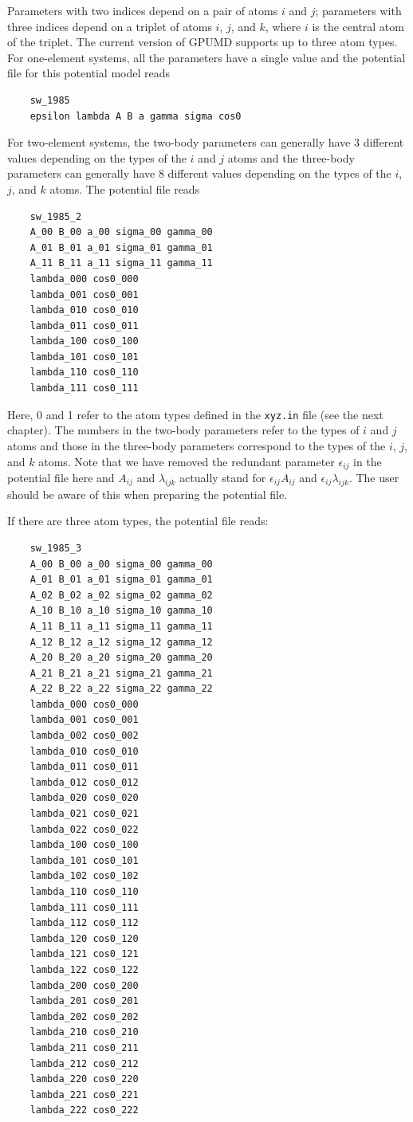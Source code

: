 \documentclass[12pt,a4paper]{report}
\begin{document}
Parameters with two indices depend on a pair of atoms $i$ and $j$; parameters with three indices depend on a triplet of atoms $i$, $j$, and $k$, where $i$ is the central atom of the triplet. The current version of GPUMD supports up to three atom types. For one-element systems, all the parameters have a single value and the potential file for this potential model reads
\begin{verbatim}
    sw_1985
    epsilon lambda A B a gamma sigma cos0
\end{verbatim}
For two-element systems, the two-body parameters can generally have 3 different values depending on the types of the $i$ and $j$ atoms and the three-body parameters can generally have 8 different values depending on the types of the $i$, $j$, and $k$ atoms. The potential file reads
\begin{verbatim}
    sw_1985_2
    A_00 B_00 a_00 sigma_00 gamma_00
    A_01 B_01 a_01 sigma_01 gamma_01
    A_11 B_11 a_11 sigma_11 gamma_11
    lambda_000 cos0_000
    lambda_001 cos0_001
    lambda_010 cos0_010
    lambda_011 cos0_011
    lambda_100 cos0_100
    lambda_101 cos0_101
    lambda_110 cos0_110
    lambda_111 cos0_111
\end{verbatim}
Here, 0 and 1 refer to the atom types defined in the \verb"xyz.in" file (see the next chapter). The numbers in the two-body parameters refer to the types of $i$ and $j$ atoms and those in the three-body parameters correspond to the types of the $i$, $j$, and $k$ atoms. Note that we have removed the redundant parameter $\epsilon_{ij}$ in the potential file here and $A_{ij}$ and $\lambda_{ijk}$ actually stand for $\epsilon_{ij}A_{ij}$ and $\epsilon_{ij}\lambda_{ijk}$. The user should be aware of this when preparing the potential file.

If there are three atom types, the potential file reads:
\begin{verbatim}
    sw_1985_3
    A_00 B_00 a_00 sigma_00 gamma_00
    A_01 B_01 a_01 sigma_01 gamma_01
    A_02 B_02 a_02 sigma_02 gamma_02
    A_10 B_10 a_10 sigma_10 gamma_10
    A_11 B_11 a_11 sigma_11 gamma_11
    A_12 B_12 a_12 sigma_12 gamma_12
    A_20 B_20 a_20 sigma_20 gamma_20
    A_21 B_21 a_21 sigma_21 gamma_21
    A_22 B_22 a_22 sigma_22 gamma_22
    lambda_000 cos0_000
    lambda_001 cos0_001
    lambda_002 cos0_002
    lambda_010 cos0_010
    lambda_011 cos0_011
    lambda_012 cos0_012
    lambda_020 cos0_020
    lambda_021 cos0_021
    lambda_022 cos0_022
    lambda_100 cos0_100
    lambda_101 cos0_101
    lambda_102 cos0_102
    lambda_110 cos0_110
    lambda_111 cos0_111
    lambda_112 cos0_112
    lambda_120 cos0_120
    lambda_121 cos0_121
    lambda_122 cos0_122
    lambda_200 cos0_200
    lambda_201 cos0_201
    lambda_202 cos0_202
    lambda_210 cos0_210
    lambda_211 cos0_211
    lambda_212 cos0_212
    lambda_220 cos0_220
    lambda_221 cos0_221
    lambda_222 cos0_222
\end{verbatim}
\end{document}
